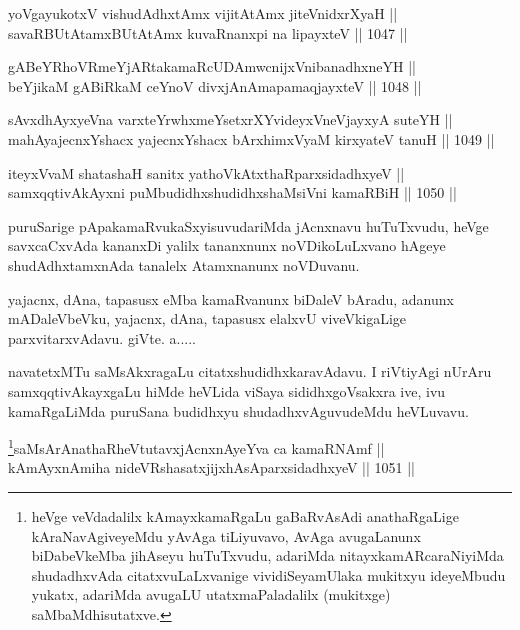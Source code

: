 \begin{shl}
yoVgayukotxV vishudAdhxtAmx vijitAtAmx jiteVnidxrXyaH || \\
savaRBUtAtamxBUtAtAmx kuvaRnanxpi na lipayxteV \hfill || 1047 ||  
\end{shl}
				
\begin{shl}
gABeYRhoVRmeYjARtakamaRcUDAmwcnijxVnibanadhxneYH || \\
beYjikaM gABiRkaM ceYnoV divxjAnAmapamaqjayxteV \hfill || 1048 ||  
\end{shl}
				
\begin{shl}
sAvxdhAyxyeVna varxteYrwhxmeYsetxrXYvideyxVneVjayxyA suteYH || \\
mahAyajecnxYshacx yajecnxYshacx bArxhimxVyaM kirxyateV tanuH \hfill || 1049 ||  
\end{shl}
				
\begin{shl}
iteyxVvaM shatashaH sanitx yathoVkAtxthaRparxsidadhxyeV ||  \\
samxqqtivAkAyxni puMbudidhxshudidhxshaMsiVni kamaRBiH \hfill || 1050 ||  
\end{shl}

\begin{artha}
puruSarige pApakamaRvukaSxyisuvudariMda jAcnxnavu huTuTxvudu, heVge savxcaCxvAda kananxDi yalilx tananxnunx noVDikoLuLxvano hAgeye shudAdhxtamxnAda  tanalelx Atamxnanunx noVDuvanu.
\end{artha}

\begin{artha}
yajacnx, dAna, tapasusx eMba kamaRvanunx biDaleV bAradu, adanunx mADaleVbeVku, yajacnx, dAna, tapasusx elalxvU viveVkigaLige parxvitarxvAdavu. giVte. a.....
\end{artha}

\begin{artha}
navatetxMTu saMsAkxragaLu citatxshudidhxkaravAdavu. I riVtiyAgi nUrAru samxqqtivAkayxgaLu hiMde heVLida viSaya sididhxgoVsakxra ive, ivu kamaRgaLiMda puruSana budidhxyu shudadhxvAguvudeMdu heVLuvavu.
\end{artha}



\begin{shl}
\footnote{heVge veVdadalilx kAmayxkamaRgaLu gaBaRvAsAdi anathaRgaLige kAraNavAgiveyeMdu yAvAga tiLiyuvavo, AvAga avugaLanunx biDabeVkeMba jihAseyu huTuTxvudu, adariMda nitayxkamARcaraNiyiMda shudadhxvAda citatxvuLaLxvanige vividiSeyamUlaka mukitxyu ideyeMbudu yukatx, adariMda avugaLU utatxmaPaladalilx (mukitxge) saMbaMdhisutatxve.}saMsArAnathaRheVtutavxjAcnxnAyeYva ca kamaRNAmf || \\
kAmAyxnAmiha nideVRshasatxjijxhAsAparxsidadhxyeV \hfill || 1051 ||  
\end{shl}

